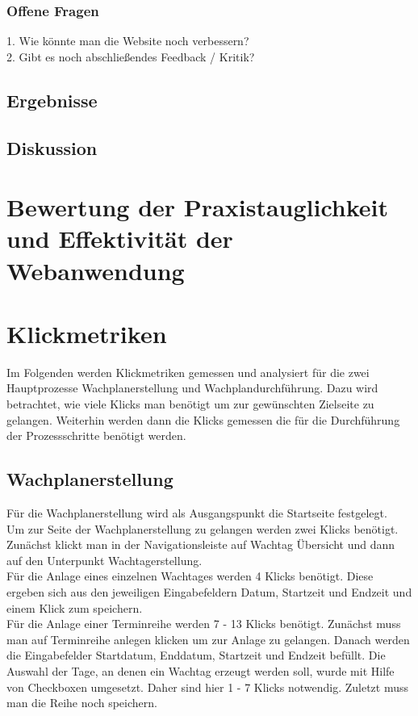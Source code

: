 \documentclass[fontsize=12pt,openright,oneside,paper=a4,BCOR=1cm]{scrbook}
\begin{document}
\subsubsection{Offene Fragen}
1. Wie könnte man die Website noch verbessern? \\
2. Gibt es noch abschließendes Feedback / Kritik?\\

\subsection{Ergebnisse}

\subsection{Diskussion}



\section{Bewertung der Praxistauglichkeit und Effektivität der Webanwendung}


\section{Klickmetriken}
Im Folgenden werden Klickmetriken gemessen und analysiert für die zwei Hauptprozesse Wachplanerstellung und Wachplandurchführung. Dazu wird betrachtet, wie viele Klicks man benötigt um zur gewünschten Zielseite zu gelangen. Weiterhin werden dann die Klicks gemessen die für die Durchführung der Prozessschritte benötigt werden.

\subsection{Wachplanerstellung}
Für die Wachplanerstellung wird als Ausgangspunkt die Startseite festgelegt. \\
Um zur Seite der Wachplanerstellung zu gelangen werden zwei Klicks benötigt. Zunächst klickt man in der Navigationsleiste auf \glqq Wachtag Übersicht\grqq{} und dann auf den Unterpunkt \glqq Wachtagerstellung\grqq{}. \\
Für die Anlage eines einzelnen Wachtages werden 4 Klicks benötigt. Diese ergeben sich aus den jeweiligen Eingabefeldern \glqq Datum\grqq{}, \glqq Startzeit\grqq{} und \glqq Endzeit\grqq{} und einem Klick zum speichern. \\
Für die Anlage einer Terminreihe werden 7 - 13 Klicks benötigt. Zunächst muss man auf \glqq Terminreihe anlegen\grqq{} klicken um zur Anlage zu gelangen. Danach werden die Eingabefelder \glqq Startdatum\grqq{}, \glqq Enddatum\grqq{}, \glqq Startzeit\grqq{} und \glqq Endzeit\grqq{} befüllt. Die Auswahl der Tage, an denen ein Wachtag erzeugt werden soll, wurde mit Hilfe von Checkboxen umgesetzt. Daher sind hier 1 - 7 Klicks notwendig. Zuletzt muss man die Reihe noch speichern. \\
\end{document}
